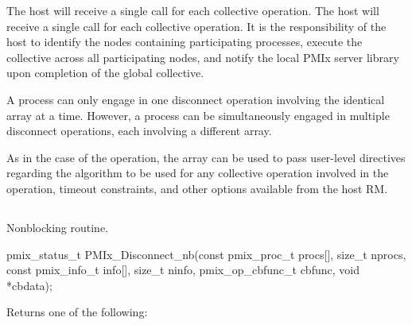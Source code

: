 \advicermstart
The host will receive a single call for each collective operation. The host will receive a single call for each collective operation. It is the responsibility of the host to identify the nodes containing participating processes, execute the collective across all participating nodes, and notify the local \ac{PMIx} server library upon completion of the global collective.

\advicermend

A process can only engage in one disconnect operation involving the identical  array at a time.
However, a process can be simultaneously engaged in multiple disconnect operations, each involving a different  array.

As in the case of the  operation, the  array can be used to pass user-level directives regarding the algorithm to be used for any collective operation involved in the operation, timeout constraints, and other options available from the host \ac{RM}.


\subsection{}

\summary

Nonblocking  routine.

\format

\cspecificstart
\begin{codepar}
pmix_status_t
PMIx_Disconnect_nb(const pmix_proc_t procs[], size_t nprocs,
                   const pmix_info_t info[], size_t ninfo,
                   pmix_op_cbfunc_t cbfunc, void *cbdata);
\end{codepar}
\cspecificend

\begin{arglist}
\end{arglist}

Returns one of the following:

